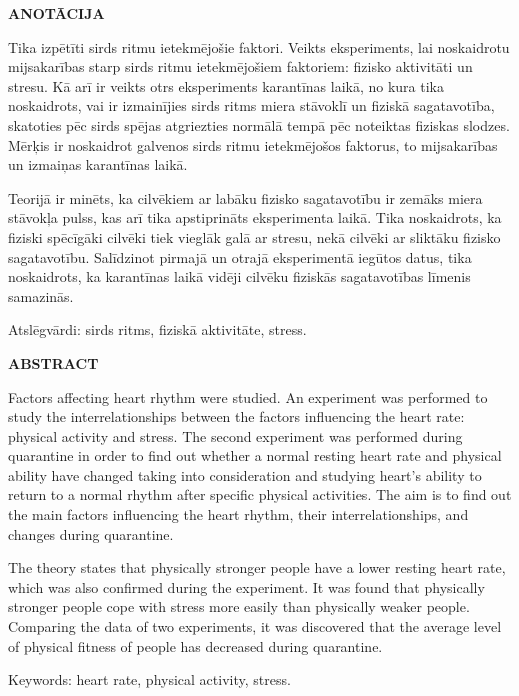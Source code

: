 \documentclass[12pt]{article}
\begin{document}
\begin{titlepage}
\begin{center}
    {\Large \bf ANOTĀCIJA}
\end{center}

Tika izpētīti sirds ritmu ietekmējošie faktori. Veikts eksperiments, lai noskaidrotu mijsakarības starp sirds ritmu ietekmējošiem faktoriem: fizisko aktivitāti un stresu. Kā arī ir veikts otrs eksperiments karantīnas laikā, no kura tika noskaidrots, vai ir izmainījies sirds ritms miera stāvoklī un fiziskā sagatavotība, skatoties pēc sirds spējas atgriezties normālā tempā pēc noteiktas fiziskas slodzes. Mērķis ir noskaidrot galvenos sirds ritmu ietekmējošos faktorus, to mijsakarības un izmaiņas karantīnas laikā.\par
Teorijā ir minēts, ka cilvēkiem ar labāku fizisko sagatavotību ir zemāks miera stāvokļa pulss, kas arī tika apstiprināts eksperimenta laikā. Tika noskaidrots, ka fiziski spēcīgāki cilvēki tiek vieglāk galā ar stresu, nekā cilvēki ar sliktāku fizisko sagatavotību. Salīdzinot pirmajā un otrajā eksperimentā iegūtos datus, tika noskaidrots, ka karantīnas laikā vidēji cilvēku fiziskās sagatavotības līmenis samazinās. 

Atslēgvārdi: sirds ritms, fiziskā aktivitāte, stress.
\vspace{4cm}

\begin{center}
    {\Large \bf ABSTRACT}
\end{center}

Factors affecting heart rhythm were studied. An experiment was performed to study the interrelationships between the factors influencing the heart rate: physical activity and stress. The second experiment was performed during quarantine in order to find out whether a normal resting heart rate and physical ability have changed taking into consideration and studying heart's ability to return to a normal rhythm after specific physical activities. The aim is to find out the main factors influencing the heart rhythm, their interrelationships, and changes during quarantine.\par
The theory states that physically stronger people have a lower resting heart rate, which was also confirmed during the experiment. It was found that physically stronger people cope with stress more easily than physically weaker people. Comparing the data of two experiments, it was discovered that the average level of physical fitness of people has decreased during quarantine.
\par
Keywords: heart rate, physical activity, stress.

\end{titlepage}
\end{document}
